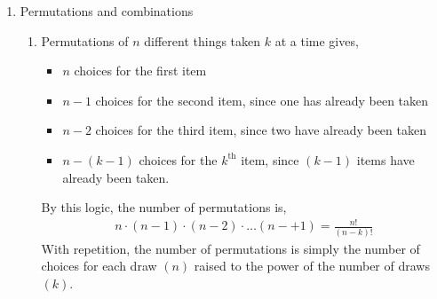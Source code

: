 \begin{enumerate}
    \item Permutations and combinations
          \begin{enumerate}
              \item Permutations of $ n $ different things taken $ k $ at a time gives,
                    \begin{itemize}
                        \item $ n $ choices for the first item
                        \item $ n-1 $ choices for the second item, since one has
                              already been taken
                        \item $ n-2 $ choices for the third item, since two have
                              already been taken
                        \item $ n-(k-1) $ choices for the $ k^{\text{th}} $ item, since
                              $ (k-1) $ items have already been taken.
                    \end{itemize}
                    By this logic, the number of permutations is,
                    \begin{align}
                        n \cdot (n-1) \cdot (n-2) \cdot \dots (n-+1) = \frac{n!}{(n-k)!}
                    \end{align}
                    With repetition, the number of permutations is simply the number
                    of choices for each draw $ (n) $ raised to the power of the number
                    of draws $ (k) $.


\end{enumerate}
\end{enumerate}
